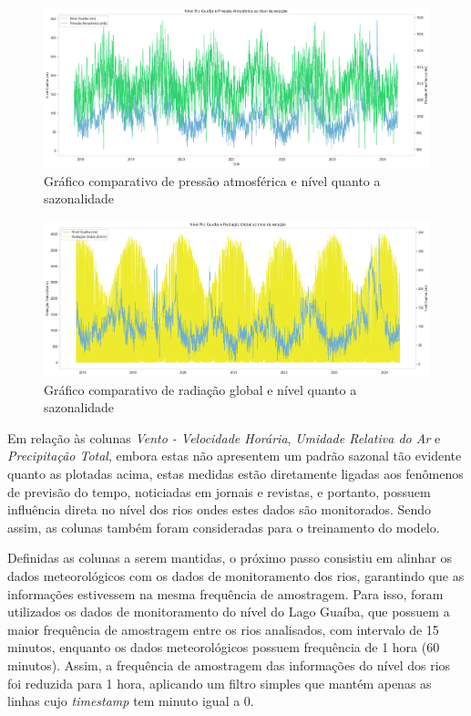 \begin{figure}[H]
	\caption{\label{fig:comparacao_pressao_nivel_rio}Gráfico comparativo de pressão atmosférica e nível quanto a sazonalidade}
	\begin{center}
		\includegraphics[scale=0.35]{figuras/comparacao_pressao_nivel_rio.png}
	\end{center}
\end{figure}

\begin{figure}[H]
	\caption{\label{fig:comparacao_radiacao_nivel_rio}Gráfico comparativo de radiação global e nível quanto a sazonalidade}
	\begin{center}
		\includegraphics[scale=0.35]{figuras/comparacao_radiacao_nivel_rio.png}
	\end{center}
\end{figure}

Em relação às colunas \textit{Vento - Velocidade Horária}, \textit{Umidade Relativa do Ar} e \textit{Precipitação Total}, embora estas não apresentem um padrão sazonal tão evidente quanto as plotadas acima, estas medidas estão diretamente ligadas aos fenômenos de previsão do tempo, noticiadas em jornais e revistas, e portanto, possuem influência direta no nível dos rios ondes estes dados são monitorados. Sendo assim, as colunas também foram consideradas para o treinamento do modelo.

Definidas as colunas a serem mantidas, o próximo passo consistiu em alinhar os dados meteorológicos com os dados de monitoramento dos rios, garantindo que as informações estivessem na mesma frequência de amostragem. Para isso, foram utilizados os dados de monitoramento do nível do Lago Guaíba, que possuem a maior frequência de amostragem entre os rios analisados, com intervalo de 15 minutos, enquanto os dados meteorológicos possuem frequência de 1 hora (60 minutos). Assim, a frequência de amostragem das informações do nível dos rios foi reduzida para 1 hora, aplicando um filtro simples que mantém apenas as linhas cujo \textit{timestamp} tem minuto igual a 0.

